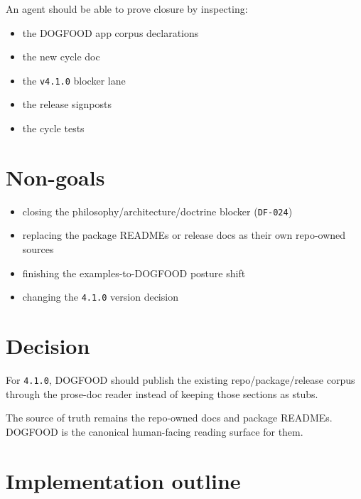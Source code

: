 An agent should be able to prove closure by inspecting:

\begin{itemize}
\tightlist
\item
  the DOGFOOD app corpus declarations
\item
  the new cycle doc
\item
  the \texttt{v\allowbreak{}4\allowbreak{}.\allowbreak{}1\allowbreak{}.\allowbreak{}0} blocker lane
\item
  the release signposts
\item
  the cycle tests
\end{itemize}

\section{Non-goals}\label{record-084-non-goals}

\begin{itemize}
\tightlist
\item
  closing the philosophy/architecture/doctrine blocker (\texttt{D\allowbreak{}F\allowbreak{}-\allowbreak{}0\allowbreak{}2\allowbreak{}4})
\item
  replacing the package READMEs or release docs as their own repo-owned sources
\item
  finishing the examples-to-DOGFOOD posture shift
\item
  changing the \texttt{4\allowbreak{}.\allowbreak{}1\allowbreak{}.\allowbreak{}0} version decision
\end{itemize}

\section{Decision}\label{record-084-decision}

For \texttt{4\allowbreak{}.\allowbreak{}1\allowbreak{}.\allowbreak{}0}, DOGFOOD should publish the existing repo/package/release corpus through the prose-doc reader instead of keeping those sections as stubs.

The source of truth remains the repo-owned docs and package READMEs. DOGFOOD is the canonical human-facing reading surface for them.

\section{Implementation outline}\label{record-084-implementation-outline}

